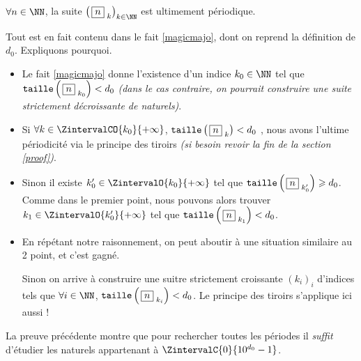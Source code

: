 \medskip

\begin{fact}\label{beautifulproof}
	$\forall n \in \NN$, la suite $\left( \, \sqseq{n}{k} \right)_{k \in \NN}$ est ultimement périodique.
\end{fact}

\begin{proof*}
	Tout est en fait contenu dans le fait \ref{magicmajo}, dont on reprend la définition de $d_0$. Expliquons pourquoi.
	\begin{itemize}[label = \textbullet]
		\item Le fait \ref{magicmajo} donne l'existence d'un indice $k_0 \in \NN$ tel que $\operatorname{\text{\normalfont\texttt{taille}}}\left( \, \fbox{$n$}_{\,\,k_0} \right) < d_0$ \emph{(dans le cas contraire, on pourrait construire une suite strictement décroissante de naturels)}.

		\item Si $\forall k \in \ZintervalCO{k_0}{+\infty}$, $\operatorname{\text{\normalfont\texttt{taille}}}\left( \, \fbox{$n$}_{\,\,k} \right) < d_0$ , nous avons l'ultime périodicité via le principe des tiroirs \emph{(si besoin revoir la fin de la section \ref{proof})}.

		\item Sinon il existe $k^\prime_0 \in \ZintervalO{k_0}{+\infty}$ tel que $\operatorname{\text{\normalfont\texttt{taille}}}\left( \, \fbox{$n$}_{\,\,k^\prime_0} \right) \geqslant d_0$. Comme dans le premier point, nous pouvons alors trouver $k_1 \in \ZintervalO{k^\prime_0}{+\infty}$ tel que $\operatorname{\text{\normalfont\texttt{taille}}}\left( \, \fbox{$n$}_{\,\,k_1} \right) < d_0$.
		
		\item En répétant notre raisonnement,
		on peut aboutir à une situation similaire au 2\ieme{} point, et c'est gagné. 
		
		\noindent
		Sinon on arrive à construire une suitre strictement croissante $\left( k_i \right)_i$ d'indices tels que $\forall i \in \NN$, $\operatorname{\text{\normalfont\texttt{taille}}}\left( \, \fbox{$n$}_{\,\,k_i} \right) < d_0$. Le principe des tiroirs s'applique ici aussi !
	\end{itemize}
\end{proof*}



\medskip

\begin{remark}
	La preuve précédente montre que pour rechercher toutes les périodes il \emph{\og suffit \fg} d'étudier les naturels appartenant à $\ZintervalC{0}{10^{d_0} - 1}$.
\end{remark}
